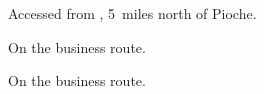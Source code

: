 
\begin{LocationList}

Accessed from , 5~miles north of Pioche.

\Location{\GasStation \Gas}
On the business route.

\Location{\RestArea \Rest}
On the business route.

\end{LocationList}
